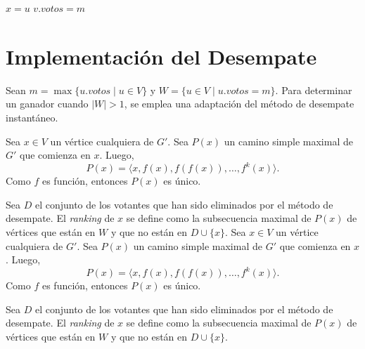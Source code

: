 
\begin{algorithm}[!h]
    \caption{\setvotestoallincyclecaption}
    \label{algo:set-votes-all-in-cycle}
    \DontPrintSemicolon
    \SetAlgoLined
    \BlankLine

    $x = u$\;
    $v.votos = m$\;
\end{algorithm}



\section{Implementaci\'on del Desempate}
Sean $m = \max\{ u.votos \;|\; u \in V \}$ y $W = \{ u \in V \;|\; u.votos = m \}$.  Para determinar un ganador cuando $|W| > 1$, se emplea una adaptaci\'on del m\'etodo de desempate instant\'aneo. 

Sea $x \in V$ un v\'ertice cualquiera de $G'$. Sea $P(x)$ un camino simple maximal de $G'$ que comienza en $x$. Luego,
$$
P(x) = \langle x, f(x), f(f(x)), \ldots, f^{k}(x) \rangle.
$$
Como $f$ es funci\'on, entonces $P(x)$ es \'unico. 

Sea $D$ el conjunto de los votantes que han sido eliminados por el m\'etodo de desempate. El \textit{ranking} de $x$ se define como  la subsecuencia maximal de $P(x)$ de v\'ertices que est\'an en $W$ y que no est\'an en $D \cup \{ x \}$. 
Sea $x \in V$ un v\'ertice cualquiera de $G'$. Sea $P(x)$ un camino simple maximal de $G'$ que comienza en $x$. Luego,
$$
P(x) = \langle x, f(x), f(f(x)), \ldots, f^{k}(x) \rangle.
$$
Como $f$ es funci\'on, entonces $P(x)$ es \'unico. 

Sea $D$ el conjunto de los votantes que han sido eliminados por el m\'etodo de desempate. El \textit{ranking} de $x$ se define como  la subsecuencia maximal de $P(x)$ de v\'ertices que est\'an en $W$ y que no est\'an en $D \cup \{ x \}$. 
